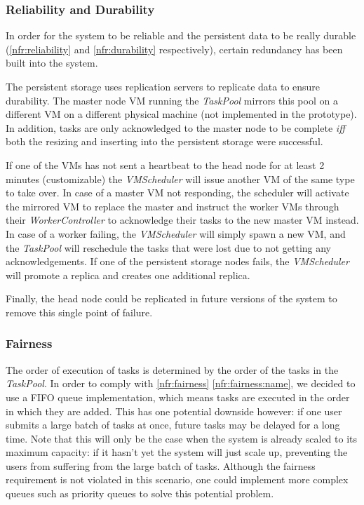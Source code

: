 \documentclass[10pt,journal,compsoc]{IEEEtran}
\def\namedref#1{\ref{#1} \ref{#1:name}}
\begin{document}
\subsubsection{Reliability and Durability}
In order for the system to be reliable and the persistent data to be really
durable (\ref{nfr:reliability} and \ref{nfr:durability} respectively), certain
redundancy has been built into the system. 

The persistent storage uses
replication servers to replicate data to ensure durability. The master node
VM running the \emph{TaskPool} mirrors this pool on a different VM on a
different physical machine (not implemented in the prototype). In addition,
tasks are only acknowledged to the master node to be complete \emph{iff} both the
resizing and inserting into the persistent storage were successful. 

If one of the VMs has not sent a heartbeat to the head node for at least 2
minutes (customizable) the \emph{VMScheduler} will issue another VM of the same
type to take over. In case of a master VM not responding, the scheduler will
activate the mirrored VM to replace the master and instruct the worker VMs through their
\emph{WorkerController} to acknowledge their tasks to the new master VM instead.
In case of a worker failing, the \emph{VMScheduler} will simply spawn a new VM,
and the \emph{TaskPool} will reschedule the tasks that were lost due to not getting
any acknowledgements. If one of the persistent storage nodes fails, the
\emph{VMScheduler} will promote a replica and creates one additional
replica.

Finally, the head node could be replicated in future versions of the system to
remove this single point of failure.

\subsubsection{Fairness}
The order of execution of tasks is determined by the order of the tasks in the
\emph{TaskPool}. In order to comply with \namedref{nfr:fairness}, we decided to
use a FIFO queue implementation, which means tasks are executed in the order in
which they are added. This has one potential downside however: if one user submits a large
batch of tasks at once, future tasks may be delayed for a long time. Note
that this will only be the case when the system is already scaled to its maximum
capacity: if it hasn't yet the system will just scale up, preventing the users
from suffering from the large batch of tasks.
Although the fairness
requirement is not violated in this scenario, one could implement more complex
queues such as priority queues to solve this potential problem.
\end{document}
